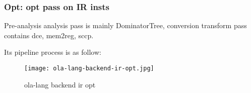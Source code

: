 \subsubsection{Opt: opt pass on IR insts}

Pre-analysis analysis pass is mainly DominatorTree, conversion transform pass contains dce, mem2reg, sccp.

Its pipeline process is as follow:
\begin{figure}[!htbp]
    \centering
    \texttt{[image: ola-lang-backend-ir-opt.jpg]}
    \caption{ola-lang backend ir opt}
    \label{fig:ola-lang-backend-ir-opt}
\end{figure}